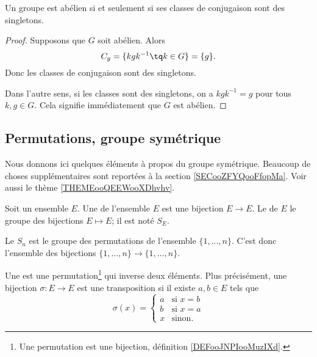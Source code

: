 \begin{lemma}       \label{LEMooQYBJooYwMwGM}
    Un groupe est abélien si et seulement si ses classes de conjugaison sont des singletons.
\end{lemma}

\begin{proof}
    Supposons que \( G\) soit abélien. Alors
    \begin{equation}
        C_g=\{ kgk^{-1}\tq k\in G \}=\{ g \}.
    \end{equation}
    Donc les classes de conjugaison sont des singletons.

    Dans l'autre sens, si les classes sont des singletons, on a \( kgk^{-1}=g\) pour tous \( k,g\in G\). Cela signifie immédiatement que \( G\) est abélien.
\end{proof}

\subsection{Permutations, groupe symétrique}

Nous donnons ici quelques éléments à propos du groupe symétrique. Beaucoup de choses supplémentaires sont reportées à la section \ref{SECooZFYQooFfopMa}. Voir aussi le thème \ref{THEMEooQEEWooXDhvhv}.

\begin{definition}      \label{DEFooJNPIooMuzIXd}
    Soit un ensemble \( E\). Une  de l'ensemble \( E\) est une bijection \( E\to E\). Le  de \( E\) le groupe des bijections \( E\mapsto E\); il est noté \( S_E\).

    Le  \( S_n\) est le groupe des permutations de l'ensemble \( \{ 1,\ldots,n \}\). C'est donc l'ensemble des bijections \( \{ 1,\ldots, n \}\to\{ 1,\ldots, n \}\).
\end{definition}


\begin{definition}      \label{DEFooXNAFooGTbTTJ}
    Une  est une permutation\footnote{Une permutation est une bijection, définition \ref{DEFooJNPIooMuzIXd}.} qui inverse deux éléments. Plus précisément, une bijection \( \sigma\colon E\to E\) est une transposition si il existe \( a,b\in E\) tels que
    \begin{equation}
        \sigma(x)=\begin{cases}
              a  &   \text{si } x=b\\
            b    &   \text{si } x=a\\
            x    &    \text{sinon. }
        \end{cases}
    \end{equation}
\end{definition}


